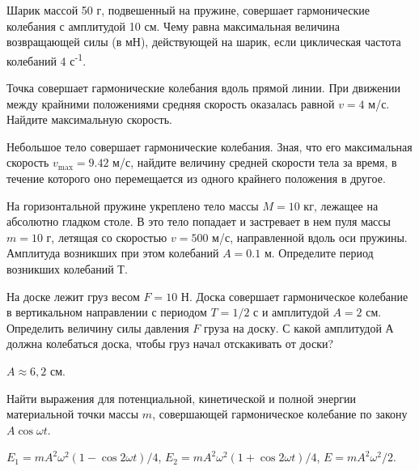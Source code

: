 \begin{ex}
Шарик массой 50 г, подвешенный на пружине, совершает гармонические колебания с амплитудой 10 см. Чему равна максимальная величина возвращающей силы (в мН), действующей на шарик, если циклическая частота колебаний 4 с\textsuperscript{-1}.
\end{ex}	

\begin{ex}
Точка совершает гармонические колебания вдоль прямой линии. При движении между крайними положениями средняя скорость оказалась равной $v = 4$ м/с. Найдите максимальную скорость.
\end{ex}	

\begin{ex}
Небольшое тело совершает гармонические колебания. Зная, что его максимальная скорость $v_{\max} = 9.42$ м/с, найдите величину средней скорости тела за время, в течение которого оно перемещается из одного крайнего положения в другое.
\end{ex}	

\begin{ex}
На горизонтальной пружине укреплено тело массы $M = 10$ кг, лежащее на абсолютно гладком столе. В это тело попадает и застревает в нем пуля массы $m = 10$ г, летящая со скоростью $v = 500$ м/с, направленной вдоль оси пружины. Амплитуда возникших при этом колебаний $A = 0.1$ м. Определите период возникших колебаний $Т$.
\end{ex}	

\begin{ex} %
На доске лежит груз весом $F = 10$ Н. Доска совершает гармоническое колебание в вертикальном направлении с периодом $T = 1/2$ с и амплитудой $A = 2$ см. Определить величину силы давления $F$ груза на доску. С какой амплитудой А должна колебаться доска, чтобы груз начал отскакивать от доски?
\begin{ans}
$A \approx 6,2$ см.
\end{ans}
\end{ex}	

\begin{ex} %
Найти выражения для потенциальной, кинетической и полной энергии материальной точки массы $m$, совершающей гармоническое колебание по закону $A \cos \omega t$.
\begin{ans}
$E_1 = m A^2 \omega^2 (1 - \cos 2 \omega t)/4$, $E_2 = m A^2 \omega^2 (1 + \cos 2 \omega t)/4$, $E = m A^2 \omega^2 /2$.
\end{ans}
\end{ex}	

